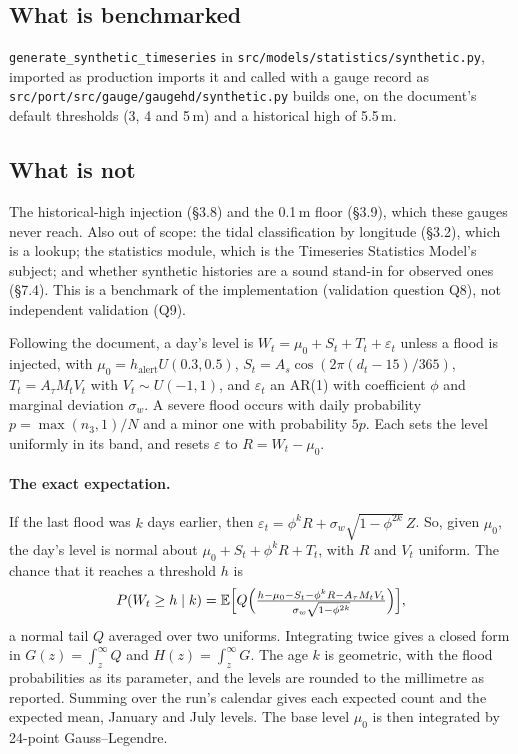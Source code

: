 \documentclass[11pt,a4paper]{article}
\begin{document}
\mkmpurpose

\subsection{What is benchmarked}
\texttt{generate\_synthetic\_timeseries} in \texttt{src/models/statistics/synthetic.py},
imported as production imports it and called with a gauge record as
\texttt{src/port/src/gauge/gaugehd/synthetic.py} builds one, on the document's default
thresholds (3, 4 and 5\,m) and a historical high of 5.5\,m.

\subsection{What is not}
The historical-high injection (\S3.8) and the 0.1\,m floor (\S3.9), which these gauges
never reach. Also out of scope: the tidal classification by longitude (\S3.2), which
is a lookup; the statistics module, which is the Timeseries Statistics Model's subject; and whether synthetic
histories are a sound stand-in for observed ones (\S7.4). This is a benchmark of the
implementation (validation question Q8), not independent validation (Q9).

\mkmframework

Following the document, a day's level is
$W_t=\mu_0+S_t+T_t+\varepsilon_t$ unless a flood is injected, with
$\mu_0=h_{\mathrm{alert}}U(0.3,0.5)$, $S_t=A_s\cos(2\pi(d_t-15)/365)$,
$T_t=A_\tau M_t V_t$ with $V_t\sim U(-1,1)$, and $\varepsilon_t$ an AR(1) with
coefficient $\phi$ and marginal deviation $\sigma_w$. A severe flood occurs with daily
probability $p=\max(n_3,1)/N$ and a minor one with probability $5p$. Each sets the
level uniformly in its band, and resets $\varepsilon$ to $R=W_t-\mu_0$.

\paragraph{The exact expectation.} If the last flood was $k$ days earlier, then
$\varepsilon_t=\phi^kR+\sigma_w\sqrt{1-\phi^{2k}}\,Z$. So, given $\mu_0$, the day's
level is normal about $\mu_0+S_t+\phi^kR+T_t$, with $R$ and $V_t$ uniform. The chance
that it reaches a threshold $h$ is
\begin{equation}
P(W_t\ge h\mid k)=\mathbb{E}\Bigl[Q\Bigl(\tfrac{h-\mu_0-S_t-\phi^kR-A_\tau M_tV_t}
{\sigma_w\sqrt{1-\phi^{2k}}}\Bigr)\Bigr],
\end{equation}
a normal tail $Q$ averaged over two uniforms. Integrating twice gives a closed form in
$G(z)=\int_z^\infty Q$ and $H(z)=\int_z^\infty G$. The age $k$ is geometric, with the
flood probabilities as its parameter, and the levels are rounded to the millimetre as
reported. Summing over the run's calendar gives each expected count and the expected
mean, January and July levels. The base level $\mu_0$ is then integrated by
24-point Gauss--Legendre.
\end{document}
